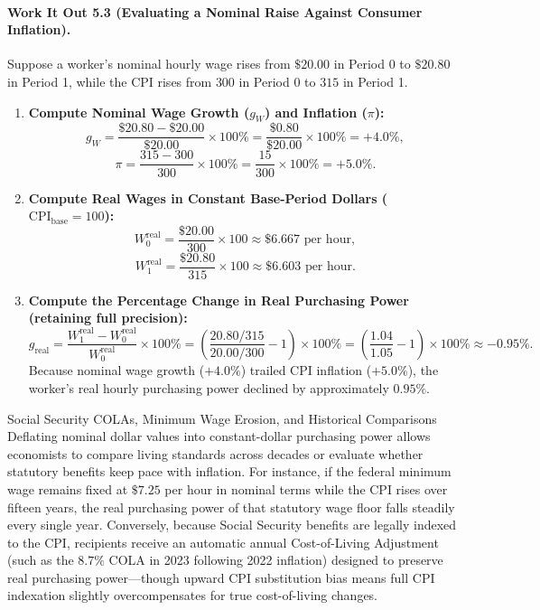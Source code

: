\documentclass[11pt,letterpaper]{article}
\begin{document}
\paragraph{Work It Out 5.3 (Evaluating a Nominal Raise Against Consumer Inflation).}
Suppose a worker's nominal hourly wage rises from $\$20.00$ in Period 0 to $\$20.80$ in Period 1, while the CPI rises from $300$ in Period 0 to $315$ in Period 1.
\begin{enumerate}
    \item \textbf{Compute Nominal Wage Growth ($g_W$) and Inflation ($\pi$):}
    $$g_W = \frac{\$20.80 - \$20.00}{\$20.00} \times 100\% = \frac{\$0.80}{\$20.00} \times 100\% = +4.0\%,$$
    $$\pi = \frac{315 - 300}{300} \times 100\% = \frac{15}{300} \times 100\% = +5.0\%.$$
    \item \textbf{Compute Real Wages in Constant Base-Period Dollars ($\text{CPI}_{\text{base}} = 100$):}
    $$W_0^{\text{real}} = \frac{\$20.00}{300} \times 100 \approx \$6.667 \text{ per hour},$$
    $$W_1^{\text{real}} = \frac{\$20.80}{315} \times 100 \approx \$6.603 \text{ per hour}.$$
    \item \textbf{Compute the Percentage Change in Real Purchasing Power (retaining full precision):}
    $$g_{\text{real}} = \frac{W_1^{\text{real}} - W_0^{\text{real}}}{W_0^{\text{real}}} \times 100\% = \left(\frac{20.80 / 315}{20.00 / 300} - 1\right) \times 100\% = \left(\frac{1.04}{1.05} - 1\right) \times 100\% \approx -0.95\%.$$
    Because nominal wage growth ($+4.0\%$) trailed CPI inflation ($+5.0\%$), the worker's real hourly purchasing power declined by approximately $0.95\%$.
\end{enumerate}

\begin{examplecase}{Social Security COLAs, Minimum Wage Erosion, and Historical Comparisons}
Deflating nominal dollar values into constant-dollar purchasing power allows economists to compare living standards across decades or evaluate whether statutory benefits keep pace with inflation. For instance, if the federal minimum wage remains fixed at $\$7.25$ per hour in nominal terms while the CPI rises over fifteen years, the real purchasing power of that statutory wage floor falls steadily every single year. Conversely, because Social Security benefits are legally indexed to the CPI, recipients receive an automatic annual Cost-of-Living Adjustment (such as the $8.7\%$ COLA in 2023 following 2022 inflation) designed to preserve real purchasing power—though upward CPI substitution bias means full CPI indexation slightly overcompensates for true cost-of-living changes.
\end{examplecase}
\end{document}
